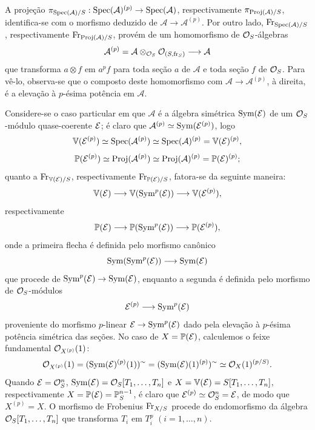 A projeção $\pi_{\operatorname{Spec}(\mathcal{A})/S}:\operatorname{Spec}(\mathcal{A})^{(p)}\to\operatorname{Spec}(\mathcal{A})$, respectivamente $\pi_{\operatorname{Proj}(\mathcal{A})/S}$, identifica-se com o morfismo deduzido de $\mathcal{A}\to\mathcal{A}^{(p)}$. Por outro lado, $\operatorname{Fr}_{\operatorname{Spec}(\mathcal{A})/S}$, respectivamente $\operatorname{Fr}_{\operatorname{Proj}(\mathcal{A})/S}$, provém de um homomorfismo de $\mathcal{O}_S$-álgebras
\[
\mathcal{A}^{(p)}=\mathcal{A}\otimes_{\mathcal{O}_S}\mathcal{O}_{(S,\operatorname{fr}_S)}\longrightarrow \mathcal{A}
\]
que transforma $a\otimes f$ em $a^p f$ para toda seção $a$ de $\mathcal{A}$ e toda seção $f$ de $\mathcal{O}_S$. Para vê-lo, observa-se que o composto deste homomorfismo com $\mathcal{A}\to\mathcal{A}^{(p)}$, à direita, é a elevação à $p$-ésima potência em $\mathcal{A}$.

Considere-se o caso particular em que $\mathcal{A}$ é a álgebra simétrica $\operatorname{Sym}(\mathcal E)$ de um $\mathcal{O}_S$-módulo quase-coerente $\mathcal E$; é claro que $\mathcal{A}^{(p)}\simeq\operatorname{Sym}(\mathcal E^{(p)})$, logo
\[
\mathbb V(\mathcal E^{(p)})\simeq\operatorname{Spec}(\mathcal{A}^{(p)})\simeq\operatorname{Spec}(\mathcal{A})^{(p)}=\mathbb V(\mathcal E)^{(p)},
\]
\[
\mathbb P(\mathcal E^{(p)})\simeq\operatorname{Proj}(\mathcal{A}^{(p)})\simeq\operatorname{Proj}(\mathcal{A})^{(p)}=\mathbb P(\mathcal E)^{(p)};
\]
quanto a $\operatorname{Fr}_{\mathbb V(\mathcal E)/S}$, respectivamente $\operatorname{Fr}_{\mathbb P(\mathcal E)/S}$, fatora-se da seguinte maneira:
\[
\mathbb V(\mathcal E)\longrightarrow \mathbb V(\operatorname{Sym}^p(\mathcal E))\longrightarrow \mathbb V(\mathcal E^{(p)}),
\]
respectivamente
\[
\mathbb P(\mathcal E)\longrightarrow \mathbb P(\operatorname{Sym}^p(\mathcal E))\longrightarrow \mathbb P(\mathcal E^{(p)}),
\]
onde a primeira flecha é definida pelo morfismo canônico
\[
\operatorname{Sym}(\operatorname{Sym}^p(\mathcal E))\longrightarrow \operatorname{Sym}(\mathcal E)
\]
que procede de $\operatorname{Sym}^p(\mathcal E)\to\operatorname{Sym}(\mathcal E)$, enquanto a segunda é definida pelo morfismo de $\mathcal{O}_S$-módulos
\[
\mathcal E^{(p)}\longrightarrow \operatorname{Sym}^p(\mathcal E)
\]
proveniente do morfismo $p$-linear $\mathcal E\to\operatorname{Sym}^p(\mathcal E)$ dado pela elevação à $p$-ésima potência simétrica das seções. No caso de $X=\mathbb P(\mathcal E)$, calculemos o feixe fundamental $\mathcal{O}_{X^{(p)}}(1)$:
\[
\mathcal{O}_{X^{(p)}}(1)=(\operatorname{Sym}(\mathcal E)^{(p)}(1))^{\sim}
=(\operatorname{Sym}(\mathcal E)(1)^{(p)})^{\sim}
\simeq \mathcal{O}_X(1)^{(p/S)}.
\]
Quando $\mathcal E=\mathcal{O}_S^n$, $\operatorname{Sym}(\mathcal E)=\mathcal{O}_S[T_1,\ldots,T_n]$ e $X=\mathbb V(\mathcal E)=S[T_1,\ldots,T_n]$, respectivamente $X=\mathbb P(\mathcal E)=\mathbb P_S^{n-1}$, é claro que $\mathcal E^{(p)}\simeq\mathcal{O}_S^n=\mathcal E$, de modo que $X^{(p)}=X$. O morfismo de Frobenius $\operatorname{Fr}_{X/S}$ procede do endomorfismo da álgebra $\mathcal{O}_S[T_1,\ldots,T_n]$ que transforma $T_i$ em $T_i^p$ $(i=1,\ldots,n)$.

